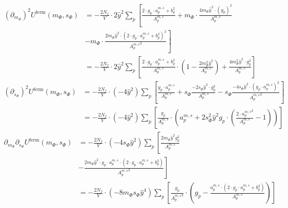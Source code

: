 \begin{align}\label{eq:CEP_derivative_dmdm_fermionicContribution}        
 \left(\partial_{m_{\Phi}} \right)^2 U^{\text{ferm}}(m_{\Phi}, s_{\Phi}) &= -\frac{2N_f}{V} \cdot 2 \hat y^2 \sum\limits_p
                   \left[ \frac{2 \cdot g_p \cdot {a_p^{m,s}} + b_p^2}{ {A_p^{m, s}} } 
                   + m_{\Phi} \cdot \frac{   4 m_{\Phi} \hat y^2 \cdot  \left(g_p\right)^2    }{{A_p^{m, s}} } \right.
       \nonumber  \\
%                    
                  &- \left. m_{\Phi} \cdot \frac{ 2 m_{\Phi} \hat y^2 \cdot \left(2 \cdot g_p \cdot {a_p^{m,s}} + b_p^2 \right)^2 }
                    { {A_p^{m, s}}^2 } \right]
       \nonumber \\
%                     
             &= -\frac{2N_f}{V} \cdot 2 \hat y^2 \sum\limits_p 
                \left[ \frac{  2 \cdot g_p \cdot {a_p^{m,s}} + b_p^2   }{ {A_p^{m, s}} } 
                  \cdot \left( 1 - \frac{2m_{\Phi}^2 \hat y ^2}{ {A_p^{m, s}} }  \right) 
                  + \frac{   4 m_{\Phi}^2 \hat y ^2 \cdot g_p^2    }{{A_p^{m, s}} }\right]
\end{align} 
\begin{align} \label{eq:CEP_derivative_dsds_fermionicContribution}
 \left(\partial_{s_{\Phi}} \right)^2 U^{\text{ferm}}(m_{\Phi}, s_{\Phi}) &= -\frac{2N_f}{V} \cdot (-4 \hat y^2) \sum\limits_p
                \left[ \frac{g_p \cdot {a_p^{m,s}} }{ {A_p^{m, s}} } 
                + s_{\Phi} \frac{ -2 s_{\Phi} \hat y^2 \cdot g_p^2}{ {A_p^{m, s}} }
                - s_{\Phi} \frac{ -4 s_{\Phi} \hat y^2 \cdot \left( g_p \cdot {a_p^{m,s}} \right)^2 }{ {A_p^{m, s}}^2 } \right]
      \nonumber \\
               &= -\frac{2N_f}{V} \cdot (-4 \hat y^2) \sum\limits_p 
                  \left[ \frac{g_p}{ {A_p^{m, s}} }\cdot \left( {a_p^{m,s}} + 2 s_{\Phi}^2 \hat y ^2 g_p 
                  \cdot \left( \frac{ 2 \cdot {a_p^{m,s}}^2}{  {A_p^{m, s}} } - 1 \right) \right) \right]
\end{align}
\begin{align} \label{eq:CEP_derivative_dmds_fermionicContribution}
 \partial_{m_{\Phi}} \partial_{s_{\Phi}}  U^{\text{ferm}}(m_{\Phi}, s_{\Phi}) &= -\frac{2N_f}{V} \cdot (-4 s_{\Phi}\hat y^2) \sum\limits_p
                   \left[ \frac{ 2 m_{\Phi} \hat y^2 g_p^2}{ {A_p^{m, s}} } \right. 
      \nonumber \\
                 & -\left. \frac{ 2 m_{\Phi} \hat y^2 \cdot g_p \cdot {a_p^{m,s}} \cdot \left( 2 \cdot g_p\cdot {a_p^{m,s}} + b_p^2 \right)}
                     { {A_p^{m, s}}^2 } \right] 
      \nonumber \\
                &= -\frac{2N_f}{V} \cdot (-8 m_{\Phi} s_{\Phi}\hat y^4) \sum\limits_p 
                    \left[ \frac{g_p}{ {A_p^{m, s}}^2 } \cdot \left( g_p  
                    - \frac{ {a_p^{m,s}} \cdot \left( 2 \cdot g_p\cdot {a_p^{m,s}} + b_p^2 \right)}
                     { {A_p^{m, s}} }\right) \right] 
\end{align}
% 
% 
